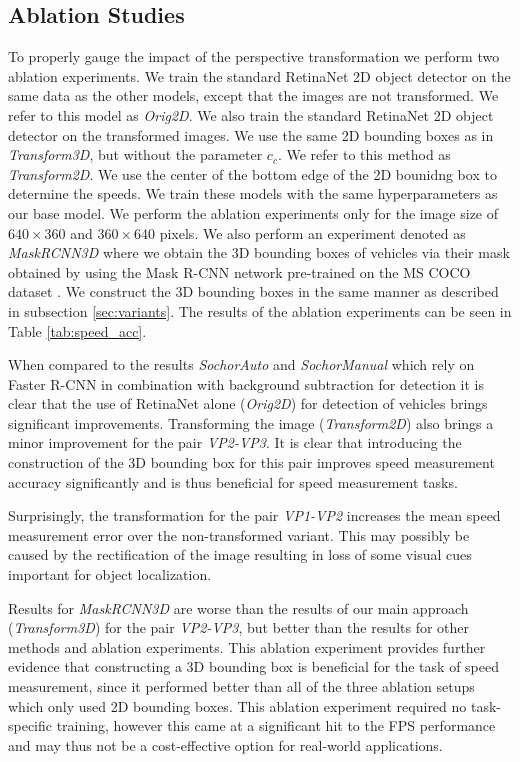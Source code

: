 \documentclass[twocolumn]{svjour3}          \smartqed  \usepackage{graphicx}
\begin{document}
\subsection{Ablation Studies}

To properly gauge the impact of the perspective transformation we perform two ablation experiments. We train the standard RetinaNet 2D object detector on the same data as the other models, except that the images are not transformed. We refer to this model as \textit{Orig2D}. We also train the standard RetinaNet 2D object detector on the transformed images. We use the same 2D bounding boxes as in \textit{Transform3D}, but without the parameter $c_c$. We refer to this method as \textit{Transform2D}. We use the center of the bottom edge of the 2D bounidng box to determine the speeds. We train these models with the same hyperparameters as our base model. We perform the ablation experiments only for the image size of $640 \times 360$ and $360 \times 640$ pixels. We also perform an experiment denoted as \textit{MaskRCNN3D} where we obtain the 3D bounding boxes of vehicles via their mask obtained by using the Mask R-CNN network \cite{MaskRCNN} pre-trained on the MS COCO dataset \cite{COCO}. We construct the 3D bounding boxes in the same manner as described in subsection \ref{sec:variants}. The results of the ablation experiments can be seen in Table \ref{tab:speed_acc}.

When compared to the results \textit{SochorAuto} and \textit{SochorManual} which rely on Faster R-CNN in combination with background subtraction for detection it is clear that the use of RetinaNet alone (\textit{Orig2D}) for detection of vehicles brings significant improvements. Transforming the image (\textit{Transform2D}) also brings a minor improvement for the pair \textit{VP2-VP3}. It is clear that introducing the construction of the 3D bounding box for this pair improves speed measurement accuracy significantly and is thus beneficial for speed measurement tasks.

Surprisingly, the transformation for the pair \textit{VP1-VP2} increases the mean speed measurement error over the non-transformed variant. This may possibly be caused by the rectification of the image resulting in loss of some visual cues important for object localization. 

Results for \textit{MaskRCNN3D} are worse than the results of our main approach (\textit{Transform3D}) for the pair \textit{VP2-VP3}, but better than the results for other methods and ablation experiments. This ablation experiment provides further evidence that constructing a 3D bounding box is beneficial for the task of speed measurement, since it performed better than all of the three ablation setups which only used 2D bounding boxes. This ablation experiment required no task-specific training, however this came at a significant hit to the FPS performance and may thus not be a cost-effective option for real-world applications.
\end{document}
